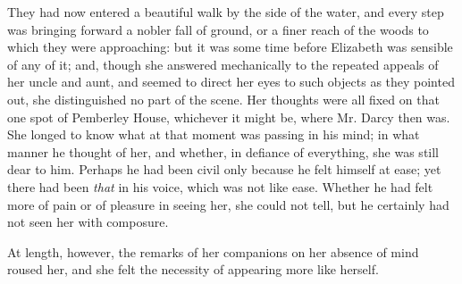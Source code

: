 They had now entered a beautiful walk by the side of the water, and every step was bringing forward a nobler fall of ground, or a finer reach of the woods to which they were approaching: but it was some time before Elizabeth was sensible of any of it; and, though she answered mechanically to the repeated appeals of her uncle and aunt, and seemed to direct her eyes to such objects as they pointed out, she distinguished no part of the scene. Her thoughts were all fixed on that one spot of Pemberley House, whichever it might be, where Mr. Darcy then was. She longed to know what at that moment was passing in his mind; in what manner he thought of her, and whether, in defiance of everything, she was still dear to him. Perhaps he had been civil only because he felt himself at ease; yet there had been \textit{that} in his voice, which was not like ease. Whether he had felt more of pain or of pleasure in seeing her, she could not tell, but he certainly had not seen her with composure.

At length, however, the remarks of her companions on her absence of mind roused her, and she felt the necessity of appearing more like herself.

